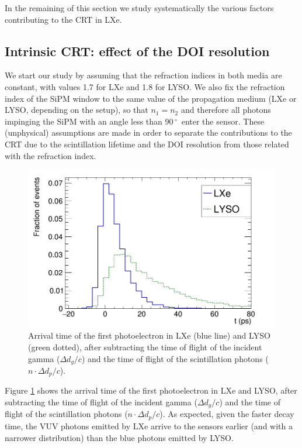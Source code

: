 \documentclass[11pt,a4paper]{article}
\begin{document}
In the remaining of this section we study systematically the various factors contributing to the CRT in LXe. 

\subsection*{Intrinsic CRT: effect of the DOI resolution}
We start our study by assuming that the refraction indices in both media are constant, with values 1.7 for LXe and 
1.8 for LYSO. We also fix the refraction index of the SiPM window to the same value of the propagation medium (LXe or LYSO, depending on the setup), so that $n_1 = n_2$ and therefore all photons impinging the SiPM with an angle less than $90\,^{\circ}$~enter the sensor. These (unphysical) assumptions are made in order to separate the contributions to the CRT due to the scintillation lifetime and the DOI resolution from those related with the refraction index. 

\begin{figure}[!bhtp]
	\centering
	\includegraphics[scale=0.36]{img/FirstPEScintLXeLYSO.png}
	\caption{\label{fig.firstPE} Arrival time of the first photoelectron in LXe (blue line) and LYSO (green dotted), after subtracting the time of flight of the incident gamma ($\Delta d_g/c$) and the time of flight of the scintillation photons ($n \cdot \Delta d_p/c$). }\label{fig.FirstPE}
\end{figure} 

Figure \ref{fig.FirstPE} shows the arrival time of the first photoelectron in LXe and LYSO, after subtracting the time of flight of the incident gamma ($\Delta d_g/c$) and the time of flight of the scintillation photons ($n \cdot \Delta d_p/c$). As expected, given the faster decay time, the VUV photons emitted by LXe arrive to the sensors earlier (and with a narrower distribution) than the blue photons emitted by LYSO. 
\end{document}
